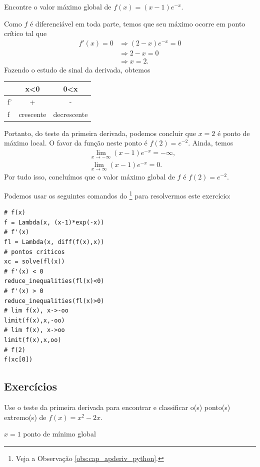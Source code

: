 \begin{exeresol}
  Encontre o valor máximo global de $f(x) = (x-1)e^{-x}$.
\end{exeresol}
\begin{resol}
  Como $f$ é diferenciável em toda parte, temos que seu máximo ocorre em ponto crítico tal que
  \begin{align}
    f'(x) = 0 &\Rightarrow (2-x)e^{-x} = 0 \\
              &\Rightarrow 2-x = 0 \\
              &\Rightarrow x = 2.
  \end{align}
  Fazendo o estudo de sinal da derivada, obtemos
  \begin{center}
    \begin{tabular}[H]{lcc}
         & x<0 & 0<x \\\hline
      f' & + & - \\
      f  & crescente & decrescente \\\hline
    \end{tabular}
  \end{center}
  Portanto, do teste da primeira derivada, podemos concluir que $x=2$ é ponto de máximo local. O favor da função neste ponto é $f(2) = e^{-2}$. Ainda, temos
  \begin{align}
    &\lim_{x\to -\infty} (x-1)e^{-x} = -\infty, \\
    &\lim_{x\to \infty} (x-1)e^{-x} = 0.
  \end{align}
  Por tudo isso, concluímos que o valor máximo global de $f$ é $f(2) = e^{-2}$.

  \ifispython
  Podemos usar os seguintes comandos do \sympy\footnote{Veja a Observação \ref{obs:cap_apderiv_python}.} para resolvermos este exercício:
\begin{verbatim}
# f(x)
f = Lambda(x, (x-1)*exp(-x))
# f'(x)
fl = Lambda(x, diff(f(x),x))
# pontos críticos
xc = solve(fl(x))
# f'(x) < 0
reduce_inequalities(fl(x)<0)
# f'(x) > 0
reduce_inequalities(fl(x)>0)
# lim f(x), x->-oo
limit(f(x),x,-oo)
# lim f(x), x->oo
limit(f(x),x,oo)
# f(2)
f(xc[0])
\end{verbatim}
  \fi
\end{resol}

\subsection*{Exercícios}

\begin{exer}
  Use o teste da primeira derivada para encontrar e classificar o(s) ponto(s) extremo(s) de $f(x) = x^2 - 2x$.
\end{exer}
\begin{resp}
  $x=1$ ponto de mínimo global
\end{resp}

